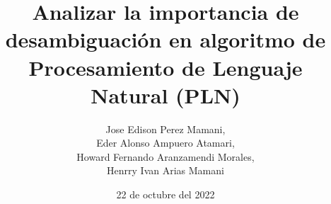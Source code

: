 \documentclass[11pt,openright,final]{unsa}
\title{Analizar la importancia de desambiguación en algoritmo de Procesamiento de Lenguaje Natural (PLN)  }
\author{Jose Edison Perez Mamani,\\
Eder Alonso Ampuero Atamari,\\
Howard Fernando Aranzamendi Morales,\\
Henrry Ivan Arias Mamani
}%
\date{22 de octubre del 2022}
\begin{document}
\makeFirstCover \makeSecondCover %
\begin{frontmatter}

\approved{\cuatro}%

\dedicatory
\begin{singlespace}
\tableofcontents \listoffigures \listoftables \pagebreak
\end{singlespace}

%
%
\end{frontmatter}%
\pagestyle{fancyplain}





\begin{singlespace}
\end{singlespace}
\end{document}
